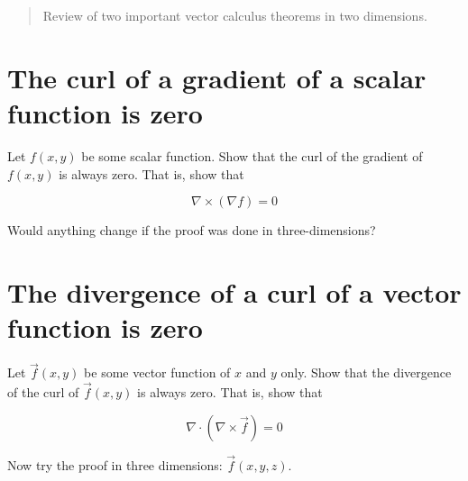 \documentclass[10pt]{article}
\begin{document}
\maketitle

\begin{abstract}
Review of two important vector calculus theorems in two dimensions.
\end{abstract}
\noindent

\section{The curl of a gradient of a scalar function is zero}

Let $f(x,y)$ be some scalar function. Show that the curl of the gradient of $f(x,y)$ is always zero.  That is, show that

\begin{equation}
\nabla \times (\nabla f) = 0
\end{equation}

\vspace{3cm}

Would anything change if the proof was done in three-dimensions?

\section{The divergence of a curl of a vector function is zero}

Let $\vec{f}(x,y)$ be some vector function of $x$ and $y$ only.  Show that the divergence of the curl of $\vec{f}(x,y)$ is always zero.  That is, show that

\begin{equation}
\nabla \cdot (\nabla \times \vec{f}) = 0
\end{equation}

Now try the proof in three dimensions: $\vec{f}(x,y,z)$.
\end{document}
